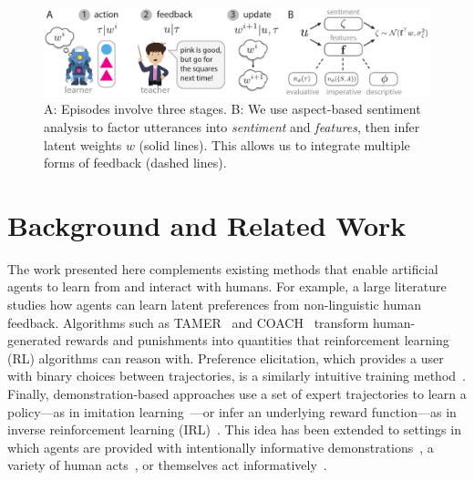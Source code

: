 \documentclass[letterpaper]{article} %
\begin{document}
\begin{figure}[t]
\begin{center}
\includegraphics[width=17.5cm]{images/Fig1}
\end{center}
\caption{A: Episodes involve three stages. B: We use aspect-based sentiment analysis to factor utterances into \textit{sentiment} and \textit{features}, then infer latent weights $w$ (solid lines). This allows us to integrate multiple forms of feedback (dashed lines).} 
\vspace{-1em}
\label{irl_language_schematic}
\end{figure}

\section{Background and Related Work}
\label{related_work_section}
The work presented here complements existing methods that enable artificial agents to learn from and interact with humans. For example, a large literature studies how agents can learn latent preferences from non-linguistic human feedback. Algorithms such as TAMER~\cite{Knox2009Interactively} and COACH~\cite{macglashan2017interactive} transform human-generated rewards and punishments into quantities that reinforcement learning (RL) algorithms can reason with. Preference elicitation, which provides a user with binary choices between trajectories, is a similarly intuitive training method~\cite{christiano2017deep}. Finally, demonstration-based approaches use a set of expert trajectories to learn a policy---as in imitation learning~\cite{ross2010efficient}---or infer an underlying reward function---as in inverse reinforcement learning (IRL)~\cite{abbeel2004apprenticeship}. This idea has been extended to settings in which agents are provided with intentionally informative demonstrations~\cite{ho2016showing}, a variety of human acts~\cite{jeon2020rewardrational}, or themselves act informatively~\cite{Dragan2013Legibility, HadfieldMenell2016cooperative}. 
\end{document}
